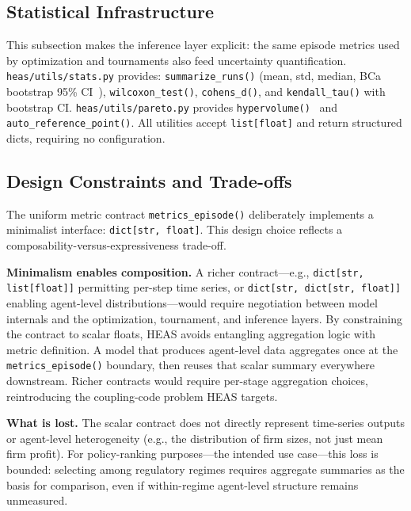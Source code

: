 \documentclass{wscpaperproc}
\begin{document}
\subsection{Statistical Infrastructure}

This subsection makes the inference layer explicit: the same episode metrics
used by optimization and tournaments also feed uncertainty quantification.
\texttt{heas/utils/stats.py} provides: \texttt{summarize\_runs()} (mean, std,
median, BCa bootstrap 95\% CI~\cite{efron1994bootstrap}),
\texttt{wilcoxon\_test()}, \texttt{cohens\_d()}, and \texttt{kendall\_tau()}
with bootstrap CI. \texttt{heas/utils/pareto.py} provides
\texttt{hypervolume()}~\cite{zitzler1998hypervolume} and
\texttt{auto\_reference\_point()}. All utilities accept \texttt{list[float]}
and return structured dicts, requiring no configuration.

\subsection{Design Constraints and Trade-offs}
\label{sec:design-constraints}

The uniform metric contract \texttt{metrics\_episode()} deliberately implements
a minimalist interface: \texttt{dict[str, float]}. This design choice reflects a
composability-versus-expressiveness trade-off.

\textbf{Minimalism enables composition.} A richer contract---e.g.,
\texttt{dict[str, list[float]]} permitting per-step time series, or
\texttt{dict[str, dict[str, float]]} enabling agent-level distributions---would
require negotiation between model internals and the optimization, tournament, and
inference layers. By constraining the contract to scalar floats, HEAS avoids
entangling aggregation logic with metric definition. A model that produces
agent-level data aggregates once at the \texttt{metrics\_episode()} boundary, then
reuses that scalar summary everywhere downstream. Richer contracts would require
per-stage aggregation choices, reintroducing the coupling-code problem HEAS targets.

\textbf{What is lost.} The scalar contract does not directly represent time-series
outputs or agent-level heterogeneity (e.g., the distribution of firm sizes, not
just mean firm profit). For policy-ranking purposes---the intended use case---this
loss is bounded: selecting among regulatory regimes requires aggregate summaries
as the basis for comparison, even if within-regime agent-level structure remains
unmeasured.
\end{document}
